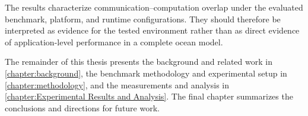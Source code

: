 The results characterize communication--computation overlap under the evaluated benchmark, platform, and runtime configurations. They should therefore be interpreted as evidence for the tested environment rather than as direct evidence of application-level performance in a complete ocean model.

The remainder of this thesis presents the background and related work in
\autoref{chapter:background}, the benchmark methodology and experimental
setup in \autoref{chapter:methodology}, and the measurements and analysis
in \autoref{chapter:Experimental Results and Analysis}. The final chapter
summarizes the conclusions and directions for future work.
